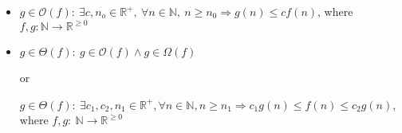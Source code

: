 \documentclass[12pt]{article}
\begin{document}
\begin{enumerate}[1.]
\begin{itemize}
            \item

            $g \in \mathcal{O}(f):\:\exists c,n_o \in \mathbb{R}^{+},\:\forall n \in
            \mathbb{N},\:n \geq n_0 \Rightarrow g(n) \leq cf(n)$, where $f,g:\mathbb{N} \to \mathbb{R}^{\geq 0}$

            \item

            $g \in \Theta(f):\: g \in \mathcal{O}(f) \land g \in \Omega(f)$

            or

            $g \in \Theta(f):\:\exists c_1,c_2,n_1 \in \mathbb{R}^{+}, \forall n \in \mathbb{N}, n \geq n_1
            \Rightarrow c_1g(n) \leq f(n) \leq c_2g(n)$, where $f,g:\:\mathbb{N} \to \mathbb{R}^{\geq 0}$
        \end{itemize}


\end{enumerate}
\end{document}
